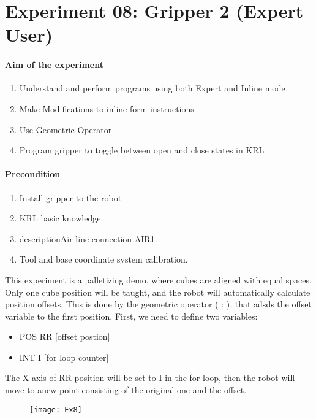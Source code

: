 \documentclass[]{book}
\begin{document}
\section{Experiment 08: Gripper 2 (Expert User)}

\paragraph{Aim of the experiment}
\begin{enumerate}
	\item Understand and perform programs using both Expert and Inline mode
	\item Make Modifications to inline form instructions 
	\item Use Geometric Operator 
	\item Program gripper to toggle between open and close states in KRL
\end{enumerate}

\paragraph{Precondition}
\begin{enumerate}
	\item Install gripper to the robot
	\item KRL basic knowledge.
	\item descriptionAir line connection AIR1. 
	\item Tool and base coordinate system calibration.
\end{enumerate}

This experiment is a palletizing demo, where cubes are aligned with equal spaces. Only one cube position will be taught, and the robot will automatically calculate position offsets. This is done by the geometric operator ( : ), that adsds the offset variable to the first position.
First, we need to define two variables: 
\begin{itemize}
	\item POS RR		[offset postion]
	\item INT I   		[for loop counter]
	
\end{itemize}
The X axis of RR position will be set to I in the for loop, then the robot will move to anew point consisting of the original one and the offset.
\begin{figure}[H]
	\centering
	\texttt{[image: Ex8]}
\end{figure}
\end{document}
